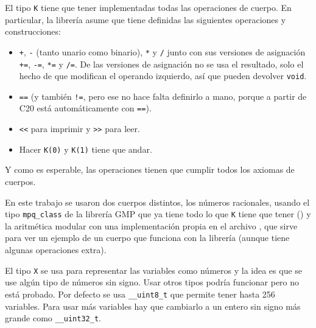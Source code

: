 \documentclass[12pt]{report}
\theoremstyle{customstyle}
\theoremstyle{factstyle}
\newcommand\cppXX{C\nolinebreak[4]\hspace{-.05em}\raisebox{.4ex}{\relsize{-3}{\textbf{++}}}20\xspace}
\begin{document}
El tipo \texttt{K} tiene que tener implementadas todas las operaciones de cuerpo. En particular, la librería asume que tiene definidas las siguientes operaciones y construcciones:

\begin{itemize}
  \item \texttt{+}, \texttt{-} (tanto unario como binario), \texttt{*} y \texttt{/} junto con sus versiones de asignación \texttt{+=}, \texttt{-=}, \texttt{*=} y \texttt{/=}. De las versiones de asignación no se usa el resultado, solo el hecho de que modifican el operando izquierdo, así que pueden devolver \texttt{void}.
  \item \texttt{==} (y también \texttt{!=}, pero ese no hace falta definirlo a mano, porque a partir de \cppXX está automáticamente con \texttt{==}).
  \item \texttt{<<} para imprimir y \texttt{>>} para leer.
  \item Hacer \texttt{K(0)} y \texttt{K(1)} tiene que andar.
\end{itemize}

Y como es esperable, las operaciones tienen que cumplir todos los axiomas de cuerpos.

En este trabajo se usaron dos cuerpos distintos, los números racionales, usando el tipo \texttt{mpq\_class} de la librería GMP que ya tiene todo lo que \texttt{K} tiene que tener (\cite{lib:gmp}) y la aritmética modular con una implementación propia en el archivo , que sirve para ver un ejemplo de un cuerpo que funciona con la librería (aunque tiene algunas operaciones extra).

El tipo \texttt{X} se usa para representar las variables como números y la idea es que se use algún tipo de números sin signo. Usar otros tipos podría funcionar pero no está probado. Por defecto se usa \texttt{\_\_uint8\_t} que permite tener hasta 256 variables. Para usar más variables hay que cambiarlo a un entero sin signo más grande como \texttt{\_\_uint32\_t}.
\end{document}
